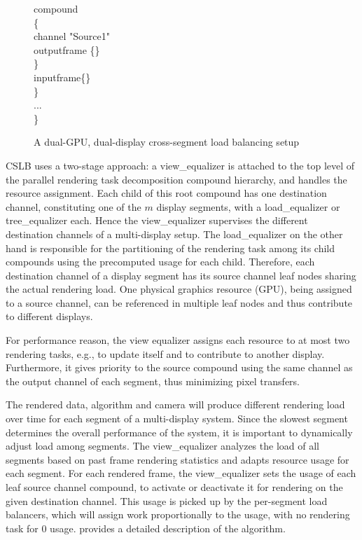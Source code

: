 \begin{figure}[h!t]
{\begin{minipage}[b]{0.46\textwidth}
{\quad \quad compound \\
\quad \quad \{  \\
\quad \quad \quad channel "Source1"  \\
\quad \quad \quad outputframe \{\}  \\
\quad \quad \} \\
\quad \quad inputframe\{\} \\
\quad \} \\
\quad ... \\
\} \\
	\label{fViewEqualizerConfig}}
	\end{minipage}
   }
\caption{A dual-GPU, dual-display cross-segment load balancing setup}
\label{fViewEqualizer}
\end{figure}

CSLB uses a two-stage approach: a {\sf view\_equalizer} is attached to the top
level of the parallel rendering task decomposition compound hierarchy, and
handles the resource assignment. Each child of this root compound has one
destination channel, constituting one of the $m$ display segments, with a {\sf
load\_equalizer} or \textsf{tree\_equalizer} each. Hence the {\sf
view\_equalizer} supervises the different destination channels of a
multi-display setup. The {\sf load\_equalizer} on the other hand is responsible
for the partitioning of the rendering task among its child compounds using the
precomputed usage for each child. Therefore, each destination channel of a
display segment has its source channel leaf nodes sharing the actual rendering
load. One physical graphics resource (GPU), being assigned to a source channel,
can be referenced in multiple leaf nodes and thus contribute to different
displays.

For performance reason, the view equalizer assigns each resource to at most two
rendering tasks, e.g., to update itself and to contribute to another display.
Furthermore, it gives priority to the source compound using the same channel as
the output channel of each segment, thus minimizing pixel transfers.

The rendered data, algorithm and camera will produce different rendering load
over time for each segment of a multi-display system. Since the slowest segment
determines the overall performance of the system, it is important to
dynamically adjust load among segments. The {\sf view\_equalizer} analyzes the
load of all segments based on past frame rendering statistics and adapts
resource usage for each segment. For each rendered frame, the {\sf
view\_equalizer} sets the usage of each leaf source channel compound, to
activate or deactivate it for rendering on the given destination channel. This
usage is picked up by the per-segment load balancers, which will assign work
proportionally to the usage, with no rendering task for $0$ usage.
\cite{EEP:11} provides a detailed description of the algorithm.

